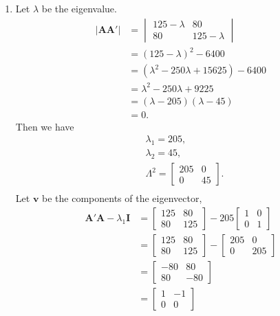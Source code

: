 \documentclass[10pt]{article}
\begin{document}
\begin{enumerate}[1)]
\item
Let $\lambda$ be the eigenvalue.
\begin{align*}
|\pmb{A}\pmb{A}'|&=
  \begin{vmatrix}
    125-\lambda & 80\\
    80 & 125-\lambda
  \end{vmatrix}
\\
&=(125-\lambda)^2-6400\\
&=(\lambda^2-250\lambda+15625)-6400\\
&=\lambda^2-250\lambda+9225\\
&=(\lambda-205)(\lambda-45)\\
&=0.
\end{align*}
Then we have
\begin{align*}
&\lambda_1=205,\\
&\lambda_2=45,\\
&\Lambda^2=
  \begin{bmatrix}
    205 & 0\\
    0 & 45
  \end{bmatrix}
.\\
\end{align*}
Let $\pmb{v}$ be the components of the eigenvector,
\begin{align*}
\pmb{A}'\pmb{A}-\lambda_1\pmb{I}&=
  \begin{bmatrix}
    125 & 80\\
    80 & 125
  \end{bmatrix}
-205
  \begin{bmatrix}
    1 & 0\\
    0 & 1
  \end{bmatrix}
\\
&=
  \begin{bmatrix}
    125 & 80\\
    80 & 125
  \end{bmatrix}
-
  \begin{bmatrix}
    205 & 0\\
    0 & 205
  \end{bmatrix}
\\
&=
  \begin{bmatrix}
    -80 & 80\\
    80 & -80
  \end{bmatrix}
\\
&=
  \begin{bmatrix}
    1 & -1\\
    0 & 0
  \end{bmatrix}
\end{align*}

\end{enumerate}
\end{document}
